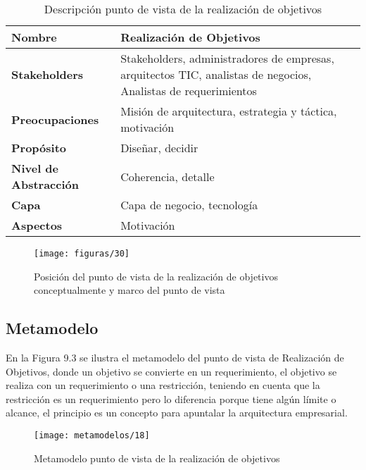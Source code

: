    \begin{table}[H]
   	\centering
   	\begin{tabular}{lp{8cm}}
   		\toprule
   		\textbf{Nombre} & \textbf{Realización de Objetivos} \\
   		\midrule
   		\textbf{Stakeholders} & Stakeholders, administradores de empresas, arquitectos TIC, analistas de negocios, Analistas de requerimientos \\
   		\textbf{Preocupaciones} & Misión de arquitectura, estrategia y táctica, motivación \\
   		\textbf{Propósito} & Diseñar, decidir \\
   		\textbf{Nivel de Abstracción} & Coherencia, detalle \\
   		\textbf{Capa} & Capa de negocio, tecnología \\
   		\textbf{Aspectos} & Motivación \\
   		\bottomrule
   	\end{tabular}
   	\captionsetup{width=.95\textwidth}
   	\caption{Descripción punto de vista de la realización de objetivos}
   	\label{tabla21}
   \end{table}
   
   \begin{figure}[H]
   	\centering
   	\texttt{[image: figuras/30]}
   	\captionsetup{width=.95\textwidth}
   	\caption{Posición del punto de vista de la realización de objetivos conceptualmente y marco del punto de vista}
   	\label{figura30}
   \end{figure}
   
   \subsection{Metamodelo}
   En la Figura 9.3 se ilustra el metamodelo del punto de vista de Realización de Objetivos, donde un objetivo se convierte en un requerimiento, el objetivo se realiza con un requerimiento o una restricción, teniendo en cuenta que la restricción es un requerimiento pero lo diferencia porque tiene algún límite o alcance, el principio es un concepto para apuntalar la arquitectura empresarial.
   
   \begin{figure}[H]
   	\centering
   	\texttt{[image: metamodelos/18]}
   	\captionsetup{width=.95\textwidth}
   	\caption{Metamodelo punto de vista de la realización de objetivos}
   	\label{metamodelo18}
   \end{figure}
   
